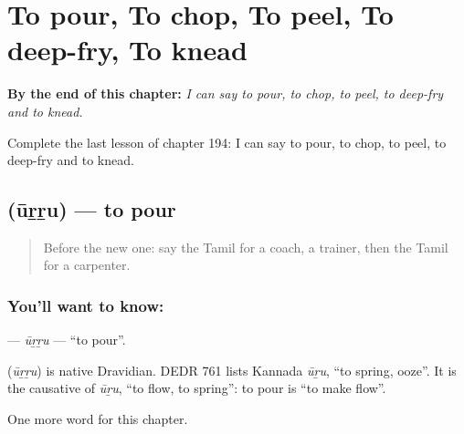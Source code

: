 
\chapter{To pour, To chop, To peel, To deep-fry, To knead}
\label{ch:ta-to-pour-to-chop-to-peel-to-deep-fry-to-knead}

\begin{chapteropening}
\textbf{By the end of this chapter:} \emph{I can say to pour, to chop, to peel, to deep-fry and to knead.}

Complete the last lesson of chapter 194: I can say to pour, to chop, to peel, to deep-fry and to knead.
\end{chapteropening}

\section[\texorpdfstring{\ta{ஊற்று} (ūṟṟu)}{ஊற்று (ūṟṟu)}]{ (ūṟṟu) — to pour}

\label{lesson:TA-C194-urru}



\begin{quote}
Before the new one: say the Tamil for a coach, a trainer, then the Tamil for a carpenter.
\end{quote}

\subsection*{You'll want to know: }
\textbf{} — \emph{ūṟṟu} — \textquotedblleft{}to pour\textquotedblright{}.

\begin{cousinweb}
\textbf{} (\emph{ūṟṟu}) is native Dravidian. DEDR 761 lists Kannada \emph{ūṟu}, \textquotedblleft{}to spring, ooze\textquotedblright{}. It is the causative of \emph{ūṟu}, \textquotedblleft{}to flow, to spring\textquotedblright{}: to pour is \textquotedblleft{}to make flow\textquotedblright{}.
\end{cousinweb}

\begin{grammarlens}[title={What you've built}]
One more word for this chapter.
\end{grammarlens}

